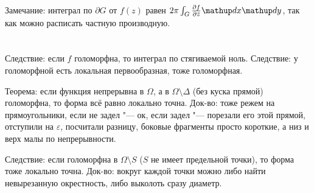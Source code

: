 	Замечание: интеграл по $\partial G$ от $f(z)$ равен $2\pi\int_G\partd{f}{\bar z}\d x\d y$,
	так как можно расписать частную производную.

\section{} %
	Следствие: если $f$ голоморфна, то интеграл по стягиваемой ноль.
	Следствие: у голоморфной есть локальная первообразная, тоже голоморфная.

	Теорема: если функция непрерывна в $\Omega$, а в $\Omega\setminus\Delta$ (без куска прямой)
	голоморфна, то форма всё равно локально точна.
	Док-во: тоже режем на прямоугольники, если не задел "--- ок, если задел "--- порезали
	его этой прямой, отступили на $\varepsilon$, посчитали разницу, боковые фрагменты просто короткие,
	а низ и верх малы по непрерывности.

	Следствие: если голоморфна в $\Omega\setminus S$ ($S$ не имеет предельной точки), то форма тоже локально точна.
	Док-во: вокруг каждой точки можно либо найти невырезанную окрестность, либо выколоть сразу диаметр.

